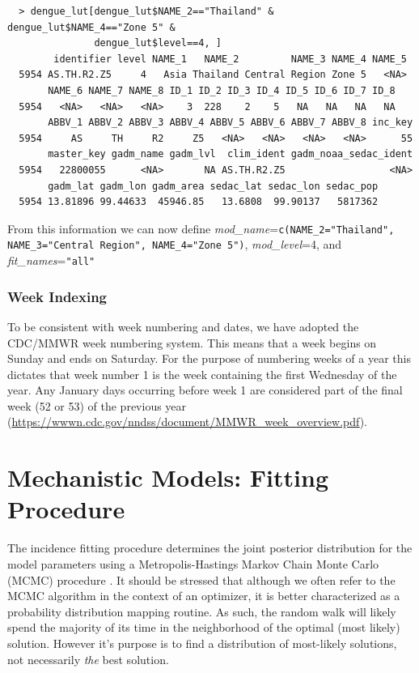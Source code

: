 \documentclass[a4paper]{article}
\begin{document}
\begin{verbatim}
  > dengue_lut[dengue_lut$NAME_2=="Thailand" & dengue_lut$NAME_4=="Zone 5" &
               dengue_lut$level==4, ]
        identifier level NAME_1   NAME_2         NAME_3 NAME_4 NAME_5
  5954 AS.TH.R2.Z5     4   Asia Thailand Central Region Zone 5   <NA>
       NAME_6 NAME_7 NAME_8 ID_1 ID_2 ID_3 ID_4 ID_5 ID_6 ID_7 ID_8
  5954   <NA>   <NA>   <NA>    3  228    2    5   NA   NA   NA   NA
       ABBV_1 ABBV_2 ABBV_3 ABBV_4 ABBV_5 ABBV_6 ABBV_7 ABBV_8 inc_key
  5954     AS     TH     R2     Z5   <NA>   <NA>   <NA>   <NA>      55
       master_key gadm_name gadm_lvl  clim_ident gadm_noaa_sedac_ident
  5954   22800055      <NA>       NA AS.TH.R2.Z5                  <NA>
       gadm_lat gadm_lon gadm_area sedac_lat sedac_lon sedac_pop
  5954 13.81896 99.44633  45946.85   13.6808  99.90137   5817362
\end{verbatim}
From this information we can now define \textit{mod\_name}=\texttt{c(NAME\_2="Thailand", NAME\_3="Central Region", NAME\_4="Zone 5")}, \textit{mod\_level}=4, and \textit{fit\_names}=\verb|"all"|


\subsubsection*{Week Indexing}
To be consistent with week numbering and dates, we have adopted the CDC/MMWR week numbering system.  This means that a week begins on Sunday and ends on Saturday.  For the purpose of numbering weeks of a year this dictates that week number 1 is the week containing the first Wednesday of the year.  Any January days occurring before week 1 are considered part of the final week (52 or 53) of the previous year (\url{https://wwwn.cdc.gov/nndss/document/MMWR_week_overview.pdf}).

\section{Mechanistic Models: Fitting Procedure}
\label{sec:FittingProcedure}
The  incidence fitting procedure determines the joint posterior
distribution for the model parameters using a Metropolis-Hastings Markov
Chain Monte Carlo (MCMC) procedure \cite{gilks96a}.  It should be stressed that although we often refer to the MCMC algorithm in the context of an optimizer, it is better characterized as a probability distribution mapping routine.  As such, the random walk will likely spend the majority of its time in the neighborhood of the optimal (most likely) solution.  However it's purpose is to find a distribution of most-likely solutions, not necessarily \textit{the} best solution.
\end{document}
